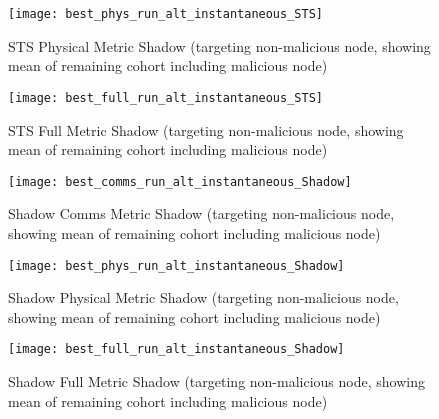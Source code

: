 \documentclass[aspectratio=43]{beamer}
\begin{document}
\begin{frame}\begin{figure}[h]
	\centering
	\texttt{[image: best\_phys\_run\_alt\_instantaneous\_STS]}
	\caption{STS Physical Metric Shadow (targeting non-malicious node, showing mean of remaining cohort including malicious node)}
	\label{fig:phys_alt_instantaneous_sts}
\end{figure}\end{frame}

\begin{frame}\begin{figure}[h]
	\centering
	\texttt{[image: best\_full\_run\_alt\_instantaneous\_STS]}
	\caption{STS Full Metric Shadow (targeting non-malicious node, showing mean of remaining cohort including malicious node)}
	\label{fig:full_alt_instantaneous_sts}
\end{figure}\end{frame}



\begin{frame}\begin{figure}[h]
	\centering
	\texttt{[image: best\_comms\_run\_alt\_instantaneous\_Shadow]}
	\caption{Shadow Comms Metric Shadow (targeting non-malicious node, showing mean of remaining cohort including malicious node)}
	\label{fig:comms_alt_instantaneous_shadow}
\end{figure}\end{frame}

\begin{frame}\begin{figure}[h]
	\centering
	\texttt{[image: best\_phys\_run\_alt\_instantaneous\_Shadow]}
	\caption{Shadow Physical Metric Shadow (targeting non-malicious node, showing mean of remaining cohort including malicious node)}
	\label{fig:phys_alt_instantaneous_shadow}
\end{figure}\end{frame}

\begin{frame}\begin{figure}[h]
	\centering
	\texttt{[image: best\_full\_run\_alt\_instantaneous\_Shadow]}
	\caption{Shadow Full Metric Shadow (targeting non-malicious node, showing mean of remaining cohort including malicious node)}
	\label{fig:full_alt_instantaneous_shadow}
\end{figure}\end{frame}
\end{document}
